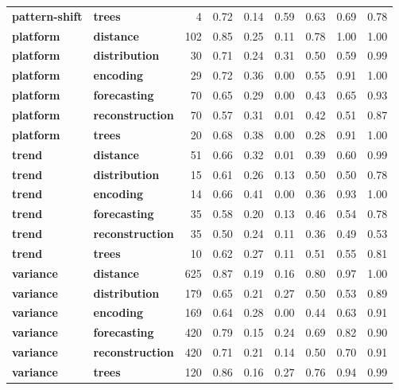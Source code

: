 \begin{table}
\begin{tabular}{llrrrrrrr}
\cline{1-9}
\textbf{pattern-shift} & \textbf{trees} & 4 & 0.72 & 0.14 & 0.59 & 0.63 & 0.69 & 0.78 \\
\cline{1-9}
\textbf{platform} & \textbf{distance} & 102 & 0.85 & 0.25 & 0.11 & 0.78 & 1.00 & 1.00 \\
\cline{1-9}
\textbf{platform} & \textbf{distribution} & 30 & 0.71 & 0.24 & 0.31 & 0.50 & 0.59 & 0.99 \\
\cline{1-9}
\textbf{platform} & \textbf{encoding} & 29 & 0.72 & 0.36 & 0.00 & 0.55 & 0.91 & 1.00 \\
\cline{1-9}
\textbf{platform} & \textbf{forecasting} & 70 & 0.65 & 0.29 & 0.00 & 0.43 & 0.65 & 0.93 \\
\cline{1-9}
\textbf{platform} & \textbf{reconstruction} & 70 & 0.57 & 0.31 & 0.01 & 0.42 & 0.51 & 0.87 \\
\cline{1-9}
\textbf{platform} & \textbf{trees} & 20 & 0.68 & 0.38 & 0.00 & 0.28 & 0.91 & 1.00 \\
\cline{1-9}
\textbf{trend} & \textbf{distance} & 51 & 0.66 & 0.32 & 0.01 & 0.39 & 0.60 & 0.99 \\
\cline{1-9}
\textbf{trend} & \textbf{distribution} & 15 & 0.61 & 0.26 & 0.13 & 0.50 & 0.50 & 0.78 \\
\cline{1-9}
\textbf{trend} & \textbf{encoding} & 14 & 0.66 & 0.41 & 0.00 & 0.36 & 0.93 & 1.00 \\
\cline{1-9}
\textbf{trend} & \textbf{forecasting} & 35 & 0.58 & 0.20 & 0.13 & 0.46 & 0.54 & 0.78 \\
\cline{1-9}
\textbf{trend} & \textbf{reconstruction} & 35 & 0.50 & 0.24 & 0.11 & 0.36 & 0.49 & 0.53 \\
\cline{1-9}
\textbf{trend} & \textbf{trees} & 10 & 0.62 & 0.27 & 0.11 & 0.51 & 0.55 & 0.81 \\
\cline{1-9}
\textbf{variance} & \textbf{distance} & 625 & 0.87 & 0.19 & 0.16 & 0.80 & 0.97 & 1.00 \\
\cline{1-9}
\textbf{variance} & \textbf{distribution} & 179 & 0.65 & 0.21 & 0.27 & 0.50 & 0.53 & 0.89 \\
\cline{1-9}
\textbf{variance} & \textbf{encoding} & 169 & 0.64 & 0.28 & 0.00 & 0.44 & 0.63 & 0.91 \\
\cline{1-9}
\textbf{variance} & \textbf{forecasting} & 420 & 0.79 & 0.15 & 0.24 & 0.69 & 0.82 & 0.90 \\
\cline{1-9}
\textbf{variance} & \textbf{reconstruction} & 420 & 0.71 & 0.21 & 0.14 & 0.50 & 0.70 & 0.91 \\
\cline{1-9}
\textbf{variance} & \textbf{trees} & 120 & 0.86 & 0.16 & 0.27 & 0.76 & 0.94 & 0.99 \\
\cline{1-9}
\bottomrule
\end{tabular}
\end{table}
